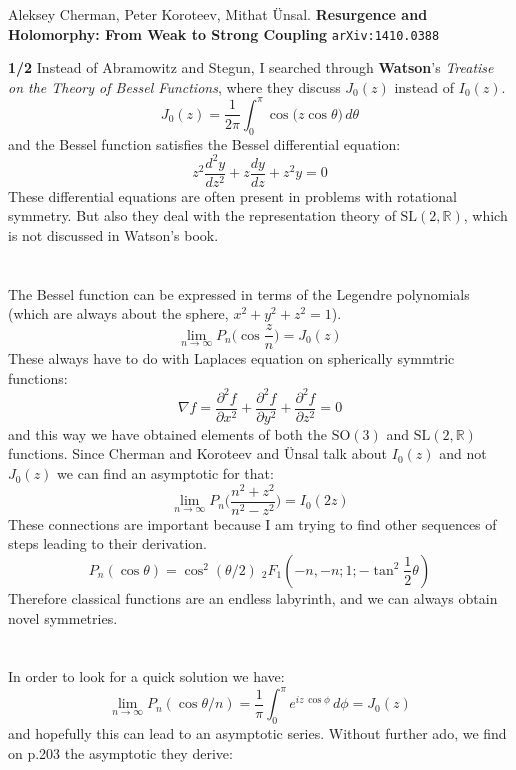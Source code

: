 \documentclass[12pt]{article}
\begin{document}
\vfill

\begin{thebibliography}{}

\item Aleksey Cherman, Peter Koroteev, Mithat \"{U}nsal.  \textbf{Resurgence and Holomorphy: From Weak to Strong Coupling} \texttt{arXiv:1410.0388}
 
\end{thebibliography}

\newpage

\noindent \textbf{1/2} Instead of Abramowitz and Stegun, I searched through \textbf{Watson}'s \textit{Treatise on the Theory of Bessel Functions}, where they discuss $J_0(z)$ instead of $I_0(z)$.
$$ J_0(z) = \frac{1}{2\pi} \int_0^{\pi}  \cos \big(z \cos \theta \big) \, d\theta $$
and the Bessel function satisfies the Bessel differential equation:
$$ z^2 \frac{d^2 y}{dz^2} + z \frac{dy}{dz} + z^2 y = 0 $$
These differential equations are often present in problems with rotational symmetry.  But also they deal with the representation theory of $\text{SL}(2, \mathbb{R})$, which is not discussed in Watson's book.\\ \\ \\
The Bessel function can be expressed in terms of the Legendre polynomials (which are always about the sphere, $x^2 + y^2 + z^2 = 1$).
$$ \lim_{n \to \infty} P_n\big( \cos \frac{z}{n}\big) = J_0(z) $$
These always have to do with Laplaces equation on spherically symmtric functions:
$$ \nabla f = \frac{\partial^2 f}{\partial x^2}
+ \frac{\partial^2 f}{\partial y^2}
+ \frac{\partial^2 f}{\partial z^2} = 0 $$
and this way we have obtained elements of both the $\text{SO}(3)$ and $\text{SL}(2, \mathbb{R})$ functions.  Since Cherman and Koroteev and \"{U}nsal talk about $I_0(z)$ and not $J_0(z)$ we can find an asymptotic for that:
$$ \lim_{n\to \infty} P_n \Big( \frac{n^2+z^2 }{n^2 - z^2 } \Big) = I_0(2z) $$
These connections are important because I am trying to find other sequences of steps leading to their derivation.
$$ P_n( \cos \theta) = \cos^2 (\theta/2)\; {}_2F_1 (-n,-n;1;-\tan^2 \frac{1}{2}\theta)$$
Therefore classical functions are an endless labyrinth, and we can always obtain novel symmetries. \\ \\ \\
In order to look for a quick solution we have:
$$ \lim_{n \to \infty} P_n (\cos \theta/n) = \frac{1}{\pi} \int_0^\pi e^{iz \, \cos \phi} \, d\phi = J_0(z)$$
and hopefully this can lead to an asymptotic series.  Without further ado, we find on p.203 the asymptotic they derive:
\end{document}
